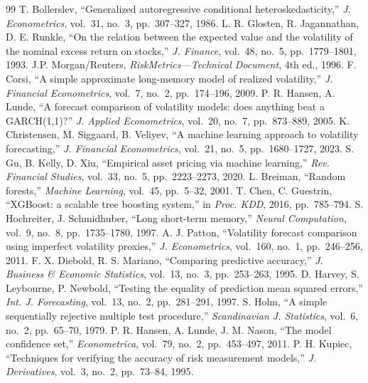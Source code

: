 \documentclass[conference,a4paper]{IEEEtran}
\begin{document}
\begin{thebibliography}{99}
 T. Bollerslev, ``Generalized autoregressive conditional heteroskedasticity,'' \emph{J. Econometrics}, vol.~31, no.~3, pp.~307--327, 1986.
 L. R. Glosten, R. Jagannathan, D. E. Runkle, ``On the relation between the expected value and the volatility of the nominal excess return on stocks,'' \emph{J. Finance}, vol.~48, no.~5, pp.~1779--1801, 1993.
 J.P. Morgan/Reuters, \emph{RiskMetrics---Technical Document}, 4th ed., 1996.
 F. Corsi, ``A simple approximate long-memory model of realized volatility,'' \emph{J. Financial Econometrics}, vol.~7, no.~2, pp.~174--196, 2009.
 P. R. Hansen, A. Lunde, ``A forecast comparison of volatility models: does anything beat a GARCH(1,1)?'' \emph{J. Applied Econometrics}, vol.~20, no.~7, pp.~873--889, 2005.
 K. Christensen, M. Siggaard, B. Veliyev, ``A machine learning approach to volatility forecasting,'' \emph{J. Financial Econometrics}, vol.~21, no.~5, pp.~1680--1727, 2023.
 S. Gu, B. Kelly, D. Xiu, ``Empirical asset pricing via machine learning,'' \emph{Rev. Financial Studies}, vol.~33, no.~5, pp.~2223--2273, 2020.
 L. Breiman, ``Random forests,'' \emph{Machine Learning}, vol.~45, pp.~5--32, 2001.
 T. Chen, C. Guestrin, ``XGBoost: a scalable tree boosting system,'' in \emph{Proc. KDD}, 2016, pp.~785--794.
 S. Hochreiter, J. Schmidhuber, ``Long short-term memory,'' \emph{Neural Computation}, vol.~9, no.~8, pp.~1735--1780, 1997.
 A. J. Patton, ``Volatility forecast comparison using imperfect volatility proxies,'' \emph{J. Econometrics}, vol.~160, no.~1, pp.~246--256, 2011.
 F. X. Diebold, R. S. Mariano, ``Comparing predictive accuracy,'' \emph{J. Business \& Economic Statistics}, vol.~13, no.~3, pp.~253--263, 1995.
 D. Harvey, S. Leybourne, P. Newbold, ``Testing the equality of prediction mean squared errors,'' \emph{Int. J. Forecasting}, vol.~13, no.~2, pp.~281--291, 1997.
 S. Holm, ``A simple sequentially rejective multiple test procedure,'' \emph{Scandinavian J. Statistics}, vol.~6, no.~2, pp.~65--70, 1979.
 P. R. Hansen, A. Lunde, J. M. Nason, ``The model confidence set,'' \emph{Econometrica}, vol.~79, no.~2, pp.~453--497, 2011.
 P. H. Kupiec, ``Techniques for verifying the accuracy of risk measurement models,'' \emph{J. Derivatives}, vol.~3, no.~2, pp.~73--84, 1995.

\end{thebibliography}
\end{document}
